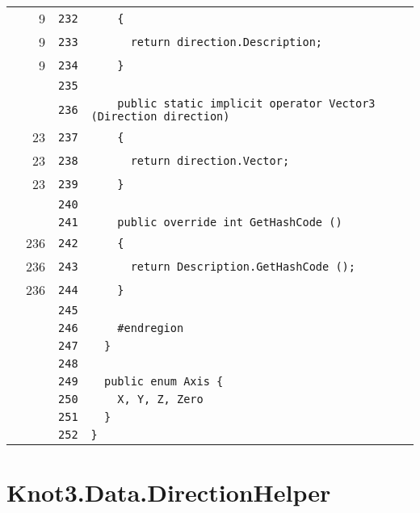 \documentclass[a4paper,10pt]{article}
\begin{document}
\begin{longtable}[l]{lrrl}
\cellcolor{green} & 9 & \verb~232~ & \verb~    {~\\
\cellcolor{green} & 9 & \verb~233~ & \verb~      return direction.Description;~\\
\cellcolor{green} & 9 & \verb~234~ & \verb~    }~\\
\cellcolor{gray} &  & \verb~235~ & \verb~~\\
\cellcolor{gray} &  & \verb~236~ & \verb~    public static implicit operator Vector3 (Direction direction)~\\
\cellcolor{green} & 23 & \verb~237~ & \verb~    {~\\
\cellcolor{green} & 23 & \verb~238~ & \verb~      return direction.Vector;~\\
\cellcolor{green} & 23 & \verb~239~ & \verb~    }~\\
\cellcolor{gray} &  & \verb~240~ & \verb~~\\
\cellcolor{gray} &  & \verb~241~ & \verb~    public override int GetHashCode ()~\\
\cellcolor{green} & 236 & \verb~242~ & \verb~    {~\\
\cellcolor{green} & 236 & \verb~243~ & \verb~      return Description.GetHashCode ();~\\
\cellcolor{green} & 236 & \verb~244~ & \verb~    }~\\
\cellcolor{gray} &  & \verb~245~ & \verb~~\\
\cellcolor{gray} &  & \verb~246~ & \verb~    #endregion~\\
\cellcolor{gray} &  & \verb~247~ & \verb~  }~\\
\cellcolor{gray} &  & \verb~248~ & \verb~~\\
\cellcolor{gray} &  & \verb~249~ & \verb~  public enum Axis {~\\
\cellcolor{gray} &  & \verb~250~ & \verb~    X, Y, Z, Zero~\\
\cellcolor{gray} &  & \verb~251~ & \verb~  }~\\
\cellcolor{gray} &  & \verb~252~ & \verb~}~\\
\end{longtable}
\newpage
\section{Knot3.Data.DirectionHelper}
\end{document}
